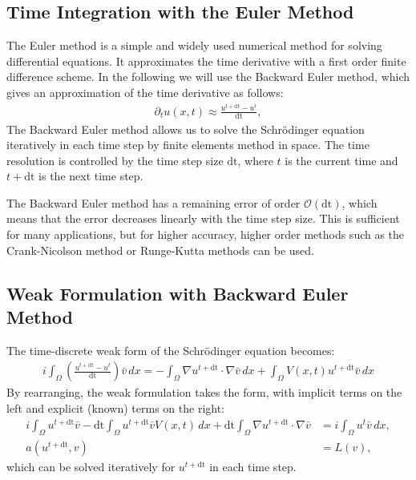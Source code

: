 \documentclass{article}
\theoremstyle{definition}
\theoremstyle{plain}
\theoremstyle{remark}
\newcommand{\dt}{\text{dt}}
\begin{document}
\subsection*{Time Integration with the Euler Method}
The Euler method is a simple and widely used numerical method for solving  differential equations.
It approximates the time derivative with a first order finite difference scheme. In the following we will use the Backward Euler method, which gives an approximation of the time derivative as follows:
\begin{align*}
    \partial_t u(x,t) \approx \frac{u^{t + \dt} - u^t}{\dt},
\end{align*}
The Backward Euler method allows us to solve the Schrödinger equation iteratively in each time step by finite elements method in space.
The time resolution is controlled by the time step size $\dt$, where $t$ is the current time and $t + \dt$ is the next time step.

The Backward Euler method has a remaining error of order $\mathcal{O}(\dt)$, which means that the error decreases linearly with the time step size. 
This is sufficient for many applications, but for higher accuracy, higher order methods such as the Crank-Nicolson method or Runge-Kutta methods can be used.


\subsection*{Weak Formulation with Backward Euler Method}
The time-discrete weak form of the Schrödinger equation becomes:
\begin{align*}
    i \int_{\Omega} \left( \frac{u^{t + \dt} - u^t}{\dt} \right) \bar{v} \, dx = - \int_{\Omega} \nabla u^{t + \dt} \cdot \nabla \bar{v} \, dx + \int_{\Omega} V(x,t) u^{t+\dt} \bar{v} \, dx
\end{align*}
By rearranging, the  weak formulation takes the form, with implicit terms on the left and explicit (known) terms on the right:
\begin{align*}
    i \int_{\Omega} u^{t + \dt} \bar{v} - \dt \int_{\Omega}  u^{t+\dt} \bar{v} V(x,t)  \, dx + \dt \int_{\Omega} \nabla u^{t + \dt} \cdot \nabla \bar{v} &= i \int_{\Omega} u^t \bar{v} \, dx ,\\
    a(u^{t + \dt}, v) &= L(v),
\end{align*}
which can be solved iteratively for $u^{t + \dt}$ in each time step.


\end{document}
